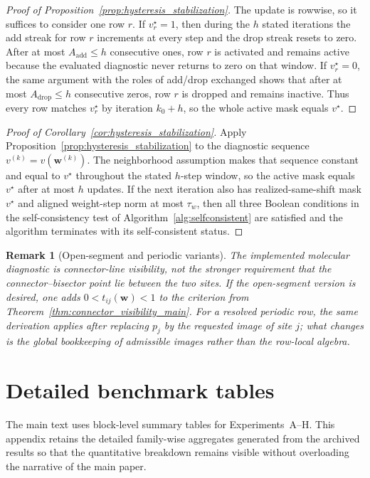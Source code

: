 \documentclass[preprint,12pt]{elsarticle}
\newtheorem{remark}{Remark}
\newcommand{\weights}{\mathbf{w}}
\begin{document}
\begin{proof}[Proof of Proposition~\ref{prop:hysteresis_stabilization}]
The update is rowwise, so it suffices to consider one row $r$. If
$v_r^\star=1$, then during the $h$ stated iterations the add streak for row $r$
increments at every step and the drop streak resets to zero. After at most
$A_{\mathrm{add}}\le h$ consecutive ones, row $r$ is activated and remains
active because the evaluated diagnostic never returns to zero on that window.
If $v_r^\star=0$, the same argument with the roles of add/drop exchanged shows
that after at most $A_{\mathrm{drop}}\le h$ consecutive zeros, row $r$ is
dropped and remains inactive. Thus every row matches $v_r^\star$ by iteration
$k_0+h$, so the whole active mask equals $v^\star$.
\end{proof}

\begin{proof}[Proof of Corollary~\ref{cor:hysteresis_stabilization}]
Apply Proposition~\ref{prop:hysteresis_stabilization} to the diagnostic sequence
$v^{(k)}=v(\weights^{(k)})$. The neighborhood assumption makes that sequence
constant and equal to $v^\star$ throughout the stated $h$-step window, so the
active mask equals $v^\star$ after at most $h$ updates. If the next iteration
also has realized-same-shift mask $v^\star$ and aligned weight-step norm at
most $\tau_w$, then all three Boolean conditions in the self-consistency test
of Algorithm~\ref{alg:selfconsistent} are satisfied and the algorithm
terminates with its self-consistent status.
\end{proof}

\begin{remark}[Open-segment and periodic variants]
The implemented molecular diagnostic is connector-line visibility, not the
stronger requirement that the connector--bisector point lie between the two
sites. If the open-segment version is desired, one adds
$0<t_{ij}(\weights)<1$ to the criterion from
Theorem~\ref{thm:connector_visibility_main}. For a resolved periodic row, the
same derivation applies after replacing $p_j$ by the requested image of site
$j$; what changes is the global bookkeeping of admissible images rather than the
row-local algebra.
\end{remark}

\section{Detailed benchmark tables}
\label{app:detailed_tables}
The main text uses block-level summary tables for Experiments~A--H. This
appendix retains the detailed family-wise aggregates generated from the archived
results so that the quantitative breakdown remains visible without overloading
the narrative of the main paper.









\clearpage

\end{document}
